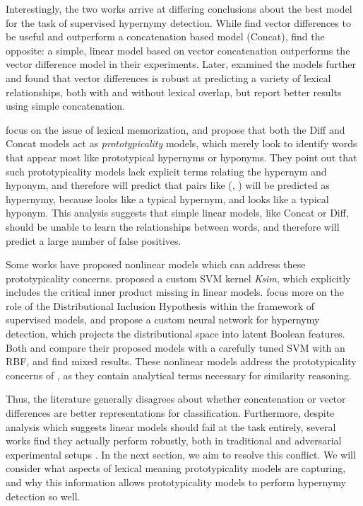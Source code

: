 Interestingly, the two works arrive at differing conclusions about the best
model for the task of supervised hypernymy detection. While
 find vector differences to be useful and outperform
a concatenation based model (Concat),  find the opposite:
a simple, linear model based on vector concatenation outperforms the vector
difference model in their experiments. Later,
 examined the models further and found that vector
differences is robust at predicting a variety of
lexical relationships, both with and without lexical overlap, but
 report better results using simple concatenation.

 focus on the issue of lexical
memorization, and propose that both the Diff and Concat models act as
{\em prototypicality} models, which merely look to identify words that appear
most like prototypical hypernyms or hyponyms. They point out that such
prototypicality models lack explicit terms relating the hypernym and hyponym,
and therefore will predict that pairs like (, ) will
be predicted as hypernymy, because  looks like a typical hypernym,
and  looks like a typical hyponym.
This analysis suggests that simple linear models, like Concat or Diff,
should be unable to learn the relationships between words, and therefore
will predict a large number of false positives.

Some works have proposed nonlinear models which can address these
prototypicality concerns.  proposed a custom SVM
kernel {\em Ksim}, which explicitly includes the critical inner product
missing in linear models.  focus more on the
role of the Distributional Inclusion Hypothesis within the framework of
supervised models, and propose a custom neural network for hypernymy
detection, which projects the distributional space into latent Boolean
features. Both  and 
compare their proposed models with a carefully tuned SVM with an RBF, and find
mixed results. These nonlinear models address the prototypicality concerns
of , as they contain analytical terms necessary for
similarity reasoning.

Thus, the literature generally disagrees about whether concatenation or
vector differences are better representations for classification. Furthermore,
despite analysis which suggests linear models should fail at the task entirely,
several works find they actually perform robustly, both in traditional and
adversarial experimental setups
\cite{roller:2014:coling,weeds:2014:coling,fu:2014:acl,shwartz:2016:acl,vylomova:2016:acl}.
In the next section, we aim to resolve this conflict. We will consider what
aspects of lexical meaning prototypicality models are capturing, and why
this information allows prototypicality models to perform hypernymy detection
so well.




